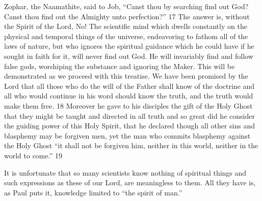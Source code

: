 Zophar, the Naamathite, said to Job, ``Canst thou by searching find out God? Canst thou find
out the Almighty unto perfection?'' 17 The answer is, without the Spirit of the Lord, No! The
scientific mind which dwells constantly on the physical and temporal things of the universe,
endeavoring to fathom all of the laws of nature, but who ignores the spiritual guidance which
he could have if he sought in faith for it, will never find out God. He will invariably find and
follow false gods, worshiping the substance and ignoring the Maker. This will be
demonstrated as we proceed with this treatise. We have been promised by the Lord that all
those who do the will of the Father shall know of the doctrine and all who would continue in
his word should know the truth, and the truth would make them free. 18 Moreover he gave to
his disciples the gift of the Holy Ghost that they might be taught and directed in all truth and
so great did he consider the guiding power of this Holy Spirit, that he declared though all
other sins and blasphemy may be forgiven men, yet the man who commits blasphemy against
the Holy Ghost ``it shall not be forgiven him, neither in this world, neither in the world to
come.'' 19

It is unfortunate that so many scientists know nothing of spiritual things and such expressions
as these of our Lord, are meaningless to them. All they have is, as Paul puts it, knowledge
limited to ``the spirit of man.''

